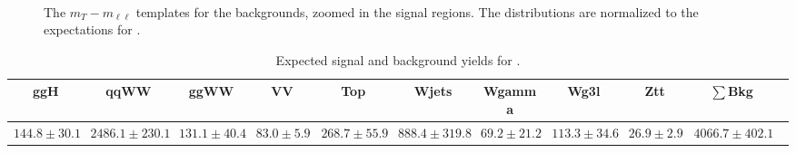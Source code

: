 \begin{figure}[!hbtp]
{}
\\

\caption{The $m_T-m_{\ell\ell}$ templates for the backgrounds, zoomed in 
the signal regions. The distributions are 
normalized to the expectations for \intlumiEightTeV.}
\label{fig:mtvsmll_bkg}
\end{figure}

\begin{table}[!hbtp]
{%
 \tiny
 \begin{center}
 \begin{tabular}{| c | c c c c c c c c c  | c}
 \hline
 ggH & qqWW & ggWW & VV & Top & Wjets & Wgamma & Wg3l & Ztt & $\sum$Bkg \\
 \hline
$144.8\pm30.1$ & $2486.1\pm230.1$ & $131.1\pm40.4$ & $83.0\pm5.9$ & $268.7\pm55.9$ & $888.4\pm319.8$ & $69.2\pm21.2$ & $113.3\pm34.6$ & $26.9\pm2.9$ & $4066.7\pm402.1$ \\ 
  
\hline
\end{tabular}
\end{center}
}
\caption{Expected signal and background yields for \intlumiEightTeV.}
\label{tab:yield}
\end{table}
